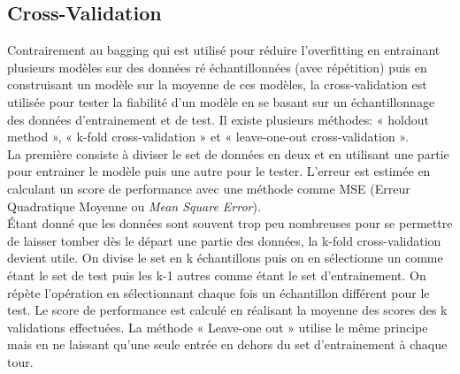 
\subsection{Cross-Validation}

Contrairement au bagging qui est utilisé pour réduire l'overfitting en entrainant plusieurs modèles sur des données ré échantillonnées (avec répétition) puis en construisant un modèle sur la moyenne de ces modèles, la cross-validation est utilisée pour tester la fiabilité d'un modèle en se basant sur un échantillonnage des données d'entrainement et de test. Il existe plusieurs méthodes: « holdout method », « k-fold cross-validation » et « leave-one-out cross-validation ».\\

\noindent La première consiste à diviser le set de données en deux et en utilisant une partie pour entrainer le modèle puis une autre pour le tester. L'erreur est estimée en calculant un score de performance avec une méthode comme MSE (Erreur Quadratique Moyenne ou \textit{Mean Square Error}). \\

\noindent Étant donné que les données sont souvent trop peu nombreuses pour se permettre de laisser tomber dès le départ une partie des données, la k-fold cross-validation devient utile. On divise le set en k échantillons puis on en sélectionne un comme étant le set de test puis les k-1 autres comme étant le set d'entrainement. On répète l'opération en sélectionnant chaque fois un échantillon différent pour le test. Le score de performance est calculé en réalisant la moyenne des scores des k validations effectuées. La méthode « Leave-one out » utilise le même principe mais en ne laissant qu'une seule entrée en dehors du set d'entrainement à chaque tour\cite{hastie_09_elements-of.statistical-learning}. 


